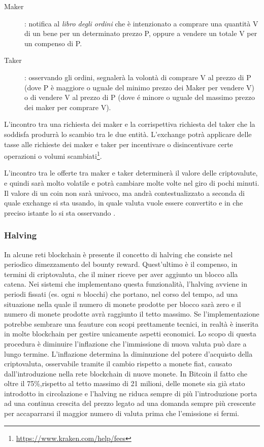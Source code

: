 \begin{description}
	\item[Maker]: notifica al \textit{libro degli ordini} che è intenzionato a comprare una quantità V di un bene per un determinato prezzo P, oppure a vendere un totale V per un compenso di P.
	\item[Taker]: osservando gli ordini, segnalerà la volontà di comprare V al prezzo di P (dove P è maggiore o uguale del minimo prezzo dei Maker per vendere V) o di vendere V al prezzo di P (dove é minore o uguale del massimo prezzo dei maker per comprare V).
\end{description} 

L'incontro tra una richiesta dei maker e la corrispettiva richiesta del taker che la soddisfa produrrà lo scambio tra le due entità. L'exchange potrà applicare delle tasse alle richieste dei maker e taker per incentivare o disincentivare certe operazioni o volumi scambiati\footnote{\url{https://www.kraken.com/help/fees}}.
 
L'incontro tra le offerte tra maker e taker determinerà il valore delle criptovalute, e quindi sarà molto volatile e potrà cambiare molte volte nel giro di pochi minuti. Il valore di un coin non sarà univoco, ma andrà contestualizzato a seconda di quale exchange si sta usando, in quale valuta vuole essere convertito e in che preciso istante lo si sta osservando \cite{seforo2014currency}.

\subsubsection{Halving}

In alcune reti blockchain è presente il concetto di halving che consiste nel periodico dimezzamento del bounty reward. Quest'ultimo è il compenso, in termini di criptovaluta, che il miner riceve per aver aggiunto un blocco alla catena. Nei sistemi che implementano questa funzionalità, l'halving avviene in periodi fissati (es. ogni $n$ blocchi) che portano, nel corso del tempo, ad una situazione nella quale il numero di monete prodotte per blocco sarà zero e il numero di monete prodotte avrà raggiunto il tetto massimo. Se l'implementazione potrebbe sembrare una feauture con scopi prettamente tecnici, in realtà è inserita in molte blockchain per gestire unicamente aspetti economici. Lo scopo di questa procedura è diminuire l'inflazione che l'immissione di nuova valuta può dare a lungo termine. L'inflazione determina la diminuzione del potere d'acquisto della criptovaluta, osservabile tramite il cambio rispetto a monete fiat, causato dall'introduzione nella rete blockchain di nuove monete. In Bitcoin il fatto che oltre il 75\%,rispetto al tetto massimo di 21 milioni, delle monete sia già stato introdotto in circolazione e l'halving ne riduca sempre di più l'introduzione porta ad una continua crescita del prezzo legato ad una domanda sempre più crescente per accaparrarsi il maggior numero di valuta prima che l'emissione si fermi.\\

